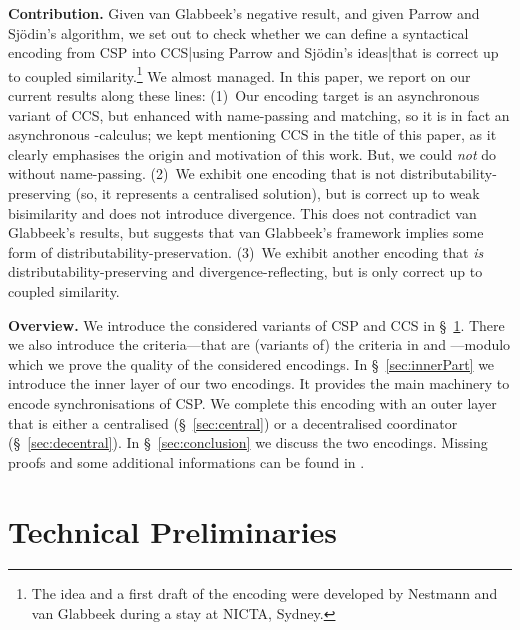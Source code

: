 \documentclass[copyright,creativecommons]{eptcs}
\begin{document}
\vspace{0.3em}
\noindent
\textbf{Contribution.}\;
Given van Glabbeek's negative result, and given Parrow and Sj\"odin's algorithm, we set out to check whether we can define a syntactical encoding from CSP into CCS|using Parrow and Sj\"odin's ideas|that is correct up to coupled similarity.\footnote{The idea and a first draft of the encoding were developed by Nestmann and van Glabbeek during a stay at NICTA, Sydney.} We almost managed. In this paper, we report on our current results along these lines: 
(1)~Our encoding target is an asynchronous variant of CCS, but enhanced with name-passing and matching, so it is in fact an asynchronous -calculus; we kept mentioning CCS in the title of this paper, as it clearly emphasises the origin and motivation of this work. But, we could \emph{not} do without name-passing.
(2)~We exhibit one encoding that is not distributability-preserving (so, it represents a centralised solution), but is correct up to weak bisimilarity and does not introduce divergence. This does not contradict van Glabbeek's results, but suggests that van Glabbeek's framework implies some form of distributability-preservation.
(3)~We exhibit another encoding that \emph{is} distributability-preserving and divergence-reflecting, but is only correct up to coupled similarity.

\vspace{0.3em}
\noindent
\textbf{Overview.}\;
We introduce the considered variants of CSP and CCS in \S~\ref{sec:techPrel}. There we also introduce the criteria---that are (variants of) the criteria in \cite{gorla10} and \cite{petersNestmannGoltz13}---modulo which we prove the quality of the considered encodings. In \S~\ref{sec:innerPart} we introduce the inner layer of our two encodings. It provides the main machinery to encode synchronisations of CSP. We complete this encoding with an outer layer that is either a centralised (\S~\ref{sec:central}) or a decentralised coordinator (\S~\ref{sec:decentral}). In \S~\ref{sec:conclusion} we discuss the two encodings. Missing proofs and some additional informations can be found in \cite{hatzelTechRep15}.



\section{Technical Preliminaries}
\label{sec:techPrel}
\end{document}
